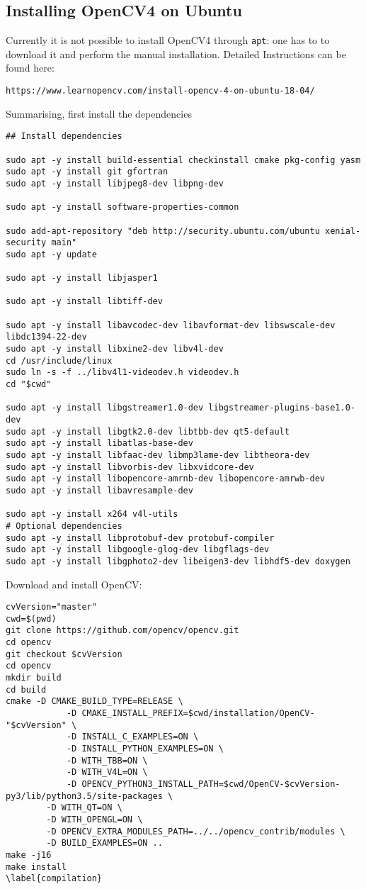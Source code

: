 \documentclass[12pt, letterpaper]{article}
\theoremstyle{definition}
\begin{document}
\subsection{Installing OpenCV4 on Ubuntu}
Currently it is not possible to install OpenCV4 through \lstinline+apt+: one has to to download it and perform the manual installation.
Detailed Instructions can be found here:
\begin{lstlisting}
https://www.learnopencv.com/install-opencv-4-on-ubuntu-18-04/
\end{lstlisting}
Summarising, first install the dependencies
\begin{lstlisting}
## Install dependencies

sudo apt -y install build-essential checkinstall cmake pkg-config yasm
sudo apt -y install git gfortran
sudo apt -y install libjpeg8-dev libpng-dev

sudo apt -y install software-properties-common

sudo add-apt-repository "deb http://security.ubuntu.com/ubuntu xenial-security main"
sudo apt -y update

sudo apt -y install libjasper1

sudo apt -y install libtiff-dev

sudo apt -y install libavcodec-dev libavformat-dev libswscale-dev libdc1394-22-dev
sudo apt -y install libxine2-dev libv4l-dev
cd /usr/include/linux
sudo ln -s -f ../libv4l1-videodev.h videodev.h
cd "$cwd"

sudo apt -y install libgstreamer1.0-dev libgstreamer-plugins-base1.0-dev
sudo apt -y install libgtk2.0-dev libtbb-dev qt5-default
sudo apt -y install libatlas-base-dev
sudo apt -y install libfaac-dev libmp3lame-dev libtheora-dev
sudo apt -y install libvorbis-dev libxvidcore-dev
sudo apt -y install libopencore-amrnb-dev libopencore-amrwb-dev
sudo apt -y install libavresample-dev

sudo apt -y install x264 v4l-utils
# Optional dependencies
sudo apt -y install libprotobuf-dev protobuf-compiler
sudo apt -y install libgoogle-glog-dev libgflags-dev
sudo apt -y install libgphoto2-dev libeigen3-dev libhdf5-dev doxygen
\end{lstlisting}

Download and install OpenCV:
\begin{lstlisting}
cvVersion="master"
cwd=$(pwd)
git clone https://github.com/opencv/opencv.git
cd opencv
git checkout $cvVersion
cd opencv
mkdir build
cd build
cmake -D CMAKE_BUILD_TYPE=RELEASE \
            -D CMAKE_INSTALL_PREFIX=$cwd/installation/OpenCV-"$cvVersion" \
            -D INSTALL_C_EXAMPLES=ON \
            -D INSTALL_PYTHON_EXAMPLES=ON \
            -D WITH_TBB=ON \
            -D WITH_V4L=ON \
            -D OPENCV_PYTHON3_INSTALL_PATH=$cwd/OpenCV-$cvVersion-py3/lib/python3.5/site-packages \
        -D WITH_QT=ON \
        -D WITH_OPENGL=ON \
        -D OPENCV_EXTRA_MODULES_PATH=../../opencv_contrib/modules \
        -D BUILD_EXAMPLES=ON ..
make -j16
make install
\label{compilation}
\end{lstlisting}
\end{document}
